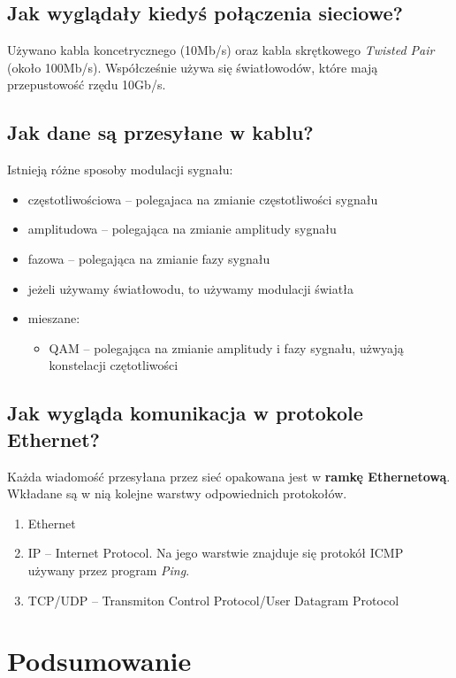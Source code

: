 \documentclass[11pt,a4paper]{article}
\begin{document}
\subsection{Jak wyglądały kiedyś połączenia sieciowe?}
Używano kabla koncetrycznego  (10Mb/s) oraz kabla skrętkowego \textit{Twisted Pair} (około 100Mb/s). Współcześnie używa się światłowodów, które mają przepustowość rzędu 10Gb/s.
\subsection{Jak dane są przesyłane w kablu?}
Istnieją różne sposoby modulacji sygnału:
\begin{itemize}
    \item częstotliwościowa -- polegajaca na zmianie częstotliwości sygnału
    \item amplitudowa -- polegająca na zmianie amplitudy sygnału
    \item fazowa -- polegająca na zmianie fazy sygnału
    \item jeżeli używamy światłowodu, to używamy modulacji światła
    \item mieszane:
        \begin{itemize}
            \item QAM -- polegająca na zmianie amplitudy i fazy sygnału, użwyają konstelacji czętotliwości
        \end{itemize}
\end{itemize}
\subsection{Jak wygląda komunikacja w protokole Ethernet?}
Każda wiadomość przesyłana przez sieć opakowana jest w \textbf{ramkę Ethernetową}. Wkładane są w nią kolejne warstwy odpowiednich protokołów.
\begin{enumerate}
    \item Ethernet
    \item IP -- Internet Protocol. Na jego warstwie znajduje się protokół ICMP używany przez program \textit{Ping}.
    \item TCP/UDP -- Transmiton Control Protocol/User Datagram Protocol
\end{enumerate}

\section{Podsumowanie}
\end{document}
